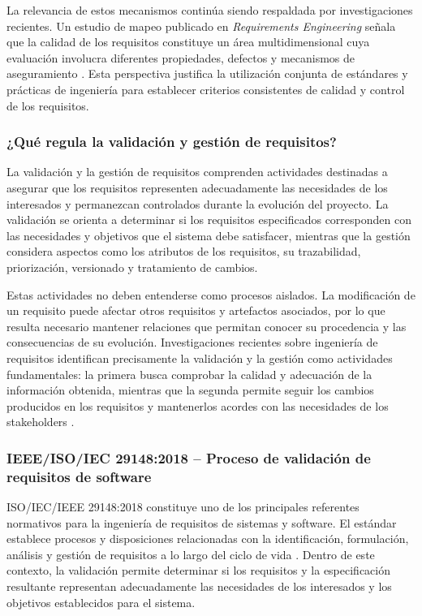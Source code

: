 \documentclass[journal,onecolumn]{IEEEtran}
\begin{document}
	La relevancia de estos mecanismos continúa siendo respaldada por investigaciones recientes. Un estudio de mapeo publicado en \textit{Requirements Engineering} señala que la calidad de los requisitos constituye un área multidimensional cuya evaluación involucra diferentes propiedades, defectos y mecanismos de aseguramiento \cite{Montgomery2022}. Esta perspectiva justifica la utilización conjunta de estándares y prácticas de ingeniería para establecer criterios consistentes de calidad y control de los requisitos.
	
	\subsubsection{¿Qué regula la validación y gestión de requisitos?}
	
	La validación y la gestión de requisitos comprenden actividades destinadas a asegurar que los requisitos representen adecuadamente las necesidades de los interesados y permanezcan controlados durante la evolución del proyecto. La validación se orienta a determinar si los requisitos especificados corresponden con las necesidades y objetivos que el sistema debe satisfacer, mientras que la gestión considera aspectos como los atributos de los requisitos, su trazabilidad, priorización, versionado y tratamiento de cambios.
	
	Estas actividades no deben entenderse como procesos aislados. La modificación de un requisito puede afectar otros requisitos y artefactos asociados, por lo que resulta necesario mantener relaciones que permitan conocer su procedencia y las consecuencias de su evolución. Investigaciones recientes sobre ingeniería de requisitos identifican precisamente la validación y la gestión como actividades fundamentales: la primera busca comprobar la calidad y adecuación de la información obtenida, mientras que la segunda permite seguir los cambios producidos en los requisitos y mantenerlos acordes con las necesidades de los stakeholders \cite{Umar2024}.
	
	\subsubsection{IEEE/ISO/IEC 29148:2018 -- Proceso de validación de requisitos de software}
	
	ISO/IEC/IEEE 29148:2018 constituye uno de los principales referentes normativos para la ingeniería de requisitos de sistemas y software. El estándar establece procesos y disposiciones relacionadas con la identificación, formulación, análisis y gestión de requisitos a lo largo del ciclo de vida \cite{ISO29148-2018}. Dentro de este contexto, la validación permite determinar si los requisitos y la especificación resultante representan adecuadamente las necesidades de los interesados y los objetivos establecidos para el sistema.
	
\end{document}
